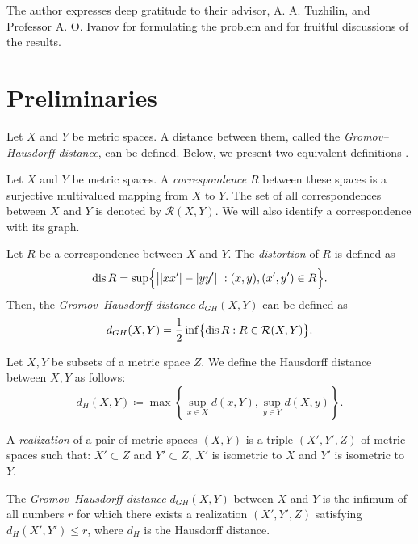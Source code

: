 \documentclass[leqno]{article}
\begin{document}
The author expresses deep gratitude to their advisor, A. A. Tuzhilin,
and Professor A. O. Ivanov for formulating the problem and for
fruitful discussions of the results.

\section{Preliminaries}

Let $ X $ and $ Y $ be metric spaces. A distance between them, called
the \emph{Gromov--Hausdorff distance}, can be defined. Below, we
present two equivalent definitions \cite{Lectures}.

\begin{definition}
    Let $ X $ and $ Y $ be metric spaces. A \emph{correspondence} $ R $
    between these spaces is a surjective multivalued mapping from $ X $
    to $ Y $. The set of all correspondences between $ X $ and $ Y $ is
    denoted by $ \mathcal{R}(X,Y) $. We will also identify a
    correspondence with its graph.
\end{definition}

\begin{definition}
    Let $ R $ be a correspondence between $ X $ and $ Y $. The
    \emph{distortion} of $ R $ is defined as
    $$
    \operatorname{dis}{R} = \sup \Bigl\{ \big| |xx'| - |yy'| \big| : (x, y), (x', y')
    \in R \Bigr\}.
    $$
    Then, the \emph{Gromov--Hausdorff distance} $ d_{GH}(X,Y) $ can
    be defined as
    $$
    d_{GH}(X,Y) = \frac{1}{2} \inf \bigl\{ \operatorname{dis}{R} : R \in
    \mathcal{R}(X,Y) \bigr\}.
    $$
    \label{defSootvet}
\end{definition}
\begin{definition}
    Let $X,Y$ be subsets of a metric space $Z$. We define the Hausdorff
    distance between $X,Y$ as follows:
    $$
    d_H(X, Y) \coloneqq \max \left\{ \sup_{x \in X} d(x, Y), \sup_{y
    \in Y} d(X, y) \right\}.
    $$
\end{definition}
\begin{definition}
    A \emph{realization} of a pair of metric spaces $ (X,Y) $ is a
    triple $ (X', Y', Z) $ of metric spaces such that:
    $ X' \subset Z $ and $ Y' \subset Z $,
    $ X' $ is isometric to $ X $ and
    $ Y' $ is isometric to $ Y $.

    The \emph{Gromov--Hausdorff distance} $ d_{GH}(X,Y) $ between $ X $
    and $ Y $ is the infimum of all numbers $ r $ for which there
    exists a realization $ (X', Y', Z) $ satisfying $ d_H(X', Y') \leq
    r $, where $ d_H $ is the Hausdorff distance.
\end{definition}
\end{document}
